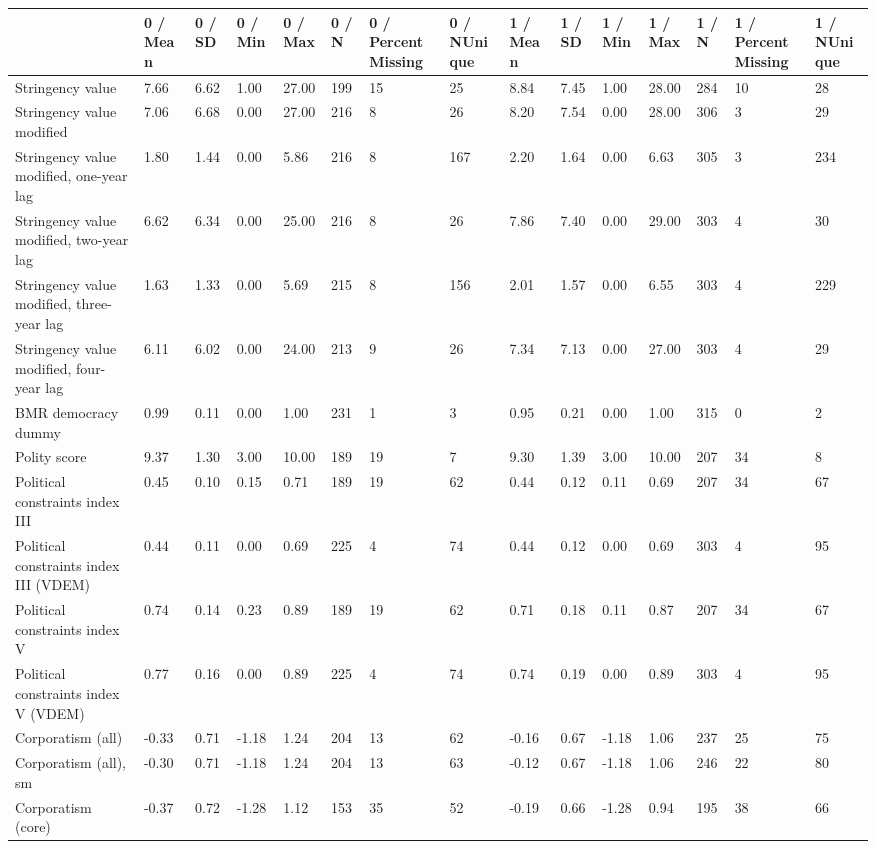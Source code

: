 
\begin{longtable}{lllllllllllllll}
\toprule
  & 0 / Mean & 0 / SD & 0 / Min & 0 / Max & 0 / N & 0 / PercentMissing & 0 / NUnique & 1 / Mean & 1 / SD & 1 / Min & 1 / Max & 1 / N & 1 / PercentMissing & 1 / NUnique\\
\midrule
Stringency value & 7.66 & 6.62 & 1.00 & 27.00 & 199 & 15 & 25 & 8.84 & 7.45 & 1.00 & 28.00 & 284 & 10 & 28\\
Stringency value modified & 7.06 & 6.68 & 0.00 & 27.00 & 216 & 8 & 26 & 8.20 & 7.54 & 0.00 & 28.00 & 306 & 3 & 29\\
Stringency value modified, one-year lag & 1.80 & 1.44 & 0.00 & 5.86 & 216 & 8 & 167 & 2.20 & 1.64 & 0.00 & 6.63 & 305 & 3 & 234\\
Stringency value modified, two-year lag & 6.62 & 6.34 & 0.00 & 25.00 & 216 & 8 & 26 & 7.86 & 7.40 & 0.00 & 29.00 & 303 & 4 & 30\\
Stringency value modified, three-year lag & 1.63 & 1.33 & 0.00 & 5.69 & 215 & 8 & 156 & 2.01 & 1.57 & 0.00 & 6.55 & 303 & 4 & 229\\
\addlinespace
Stringency value modified, four-year lag & 6.11 & 6.02 & 0.00 & 24.00 & 213 & 9 & 26 & 7.34 & 7.13 & 0.00 & 27.00 & 303 & 4 & 29\\
BMR democracy dummy & 0.99 & 0.11 & 0.00 & 1.00 & 231 & 1 & 3 & 0.95 & 0.21 & 0.00 & 1.00 & 315 & 0 & 2\\
Polity score & 9.37 & 1.30 & 3.00 & 10.00 & 189 & 19 & 7 & 9.30 & 1.39 & 3.00 & 10.00 & 207 & 34 & 8\\
Political constraints index III & 0.45 & 0.10 & 0.15 & 0.71 & 189 & 19 & 62 & 0.44 & 0.12 & 0.11 & 0.69 & 207 & 34 & 67\\
Political constraints index III (VDEM) & 0.44 & 0.11 & 0.00 & 0.69 & 225 & 4 & 74 & 0.44 & 0.12 & 0.00 & 0.69 & 303 & 4 & 95\\
\addlinespace
Political constraints index V & 0.74 & 0.14 & 0.23 & 0.89 & 189 & 19 & 62 & 0.71 & 0.18 & 0.11 & 0.87 & 207 & 34 & 67\\
Political constraints index V (VDEM) & 0.77 & 0.16 & 0.00 & 0.89 & 225 & 4 & 74 & 0.74 & 0.19 & 0.00 & 0.89 & 303 & 4 & 95\\
Corporatism (all) & -0.33 & 0.71 & -1.18 & 1.24 & 204 & 13 & 62 & -0.16 & 0.67 & -1.18 & 1.06 & 237 & 25 & 75\\
Corporatism (all), sm & -0.30 & 0.71 & -1.18 & 1.24 & 204 & 13 & 63 & -0.12 & 0.67 & -1.18 & 1.06 & 246 & 22 & 80\\
Corporatism (core) & -0.37 & 0.72 & -1.28 & 1.12 & 153 & 35 & 52 & -0.19 & 0.66 & -1.28 & 0.94 & 195 & 38 & 66\\

\end{longtable}
